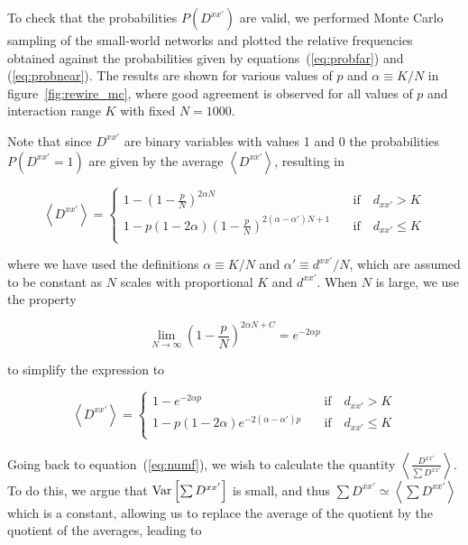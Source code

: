 To check that the probabilities $P(D^{xx'})$ are valid, we performed Monte Carlo sampling of the small-world networks and plotted the
relative frequencies obtained against the probabilities given by equations~(\ref{eq:probfar}) and (\ref{eq:probnear}). The results are
shown for various values of $p$ and $\alpha \equiv K/N$ in figure~\ref{fig:rewire_mc}, where good agreement is observed for all values
of $p$ and interaction range $K$ with fixed $N=1000$.

Note that since $D^{xx'}$ are binary variables with values 1 and 0 the probabilities $P(D^{xx'}=1)$ are given by the average
$\left<D^{xx'}\right>$, resulting in

\begin{equation}
  \left<D^{xx'}\right> =
  \begin{cases}
    1-\left( 1 - \frac{p}{N} \right)^{2\alpha N} \quad &\text{if} \quad d_{xx'}>K \\
    1-p\left( 1 - 2\alpha \right)\left( 1 - \frac{p}{N} \right)^{2(\alpha-\alpha')N+1} \quad &\text{if} \quad d_{xx'}\leq K\\
  \end{cases}
  \label{eq:probconnection}
\end{equation}

\noindent where we have used the definitions $\alpha \equiv K/N$ and $\alpha' \equiv d^{xx'}/N$, which are assumed to be constant as
$N$ scales with proportional $K$ and $d^{xx'}$. When $N$ is large, we use the property

\begin{equation*}
  \lim_{N\to \infty}\left( 1 - \frac{p}{N} \right)^{2\alpha N + C} = e^{-2\alpha p}
\end{equation*}

\noindent to simplify the expression to

\begin{equation}
  \left<D^{xx'}\right> =
  \begin{cases}
    1-e^{-2\alpha p} \quad &\text{if} \quad d_{xx'}>K \\
    1-p\left( 1 - 2\alpha \right)e^{-2(\alpha-\alpha')p} \quad &\text{if} \quad d_{xx'}\leq K\\
  \end{cases}
  \label{eq:probconnectionexp}
\end{equation}

Going back to equation~(\ref{eq:numf}), we wish to calculate the quantity $\left< \frac{D^{xx'}}{\sum D^{xx'}} \right>$. To do this, we
argue that $\text{Var}\left[{\sum D^{xx'}}\right]$ is small, and thus $\sum D^{xx'} \simeq \left< \sum D^{xx'} \right>$ which is a constant, allowing us
to replace the average of the quotient by the quotient of the averages, leading to

